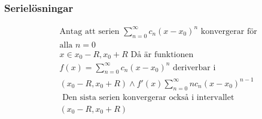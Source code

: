 \begin{multicols}{2}
\subsubsection{Serielösningar} %
\begin{align*}
  &\text{Antag att serien } \displaystyle\sum_{n=0}^{\infty} c_n{(x-x_0)}^n \text{ konvergerar för} \\
  &\text{alla } n=0 \\
  &x\in{x_0-R, x_0+R} \text{ Då är funktionen } \\
  &f(x) = \displaystyle\sum_{n=0}^{\infty} c_n{(x-x_0)}^n 
  \text{ deriverbar i }  \\
  &(x_0-R, x_0+R) \land  f'(x) \displaystyle\sum_{n=0}^{\infty} nc_n{(x-x_0)}^{n-1} \\
  &\text{ Den sista serien konvergerar också i intervallet } \\
  &(x_0-R, x_0+R) \\
\end{align*}
\end{multicols}
\raggedcolumns